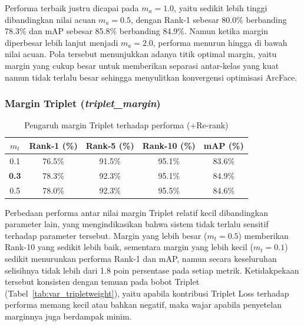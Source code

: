 Performa terbaik justru dicapai pada $m_a=1{.}0$, yaitu sedikit lebih tinggi dibandingkan nilai acuan $m_a=0{.}5$, dengan Rank-1 sebesar 80.0\% berbanding 78.3\% dan mAP sebesar 85.8\% berbanding 84.9\%. Namun ketika margin diperbesar lebih lanjut menjadi $m_a=2{.}0$, performa menurun hingga di bawah nilai acuan. Pola tersebut menunjukkan adanya titik optimal margin, yaitu margin yang cukup besar untuk memberikan separasi antar-kelas yang kuat namun tidak terlalu besar sehingga menyulitkan konvergensi optimisasi ArcFace.

\subsubsection{Margin Triplet (\textit{triplet\_margin})}

\begin{table}[H]
    \centering
    \caption{Pengaruh margin Triplet terhadap performa (+Re-rank)}
    \label{tab:var_tripletmargin}
    \renewcommand{\arraystretch}{1.25}
    \begin{tabular}{ccccc}
        \hline
        $m_t$          & \textbf{Rank-1 (\%)} & \textbf{Rank-5 (\%)} & \textbf{Rank-10 (\%)} & \textbf{mAP (\%)} \\
        \hline
        0{.}1         & 76.5\%               & 91.5\%               & 95.1\%                & 83.6\%             \\
        \textbf{0{.}3} & 78.3\%               & 92.3\%               & 95.1\%                & 84.9\%            \\
        0{.}5          & 78.0\%               & 92.3\%               & 95.5\%                & 84.6\%            \\
        \hline
    \end{tabular}
\end{table}

Perbedaan performa antar nilai margin Triplet relatif kecil dibandingkan parameter lain, yang mengindikasikan bahwa sistem tidak terlalu sensitif terhadap parameter tersebut. Margin yang lebih besar ($m_t=0{.}5$) memberikan Rank-10 yang sedikit lebih baik, sementara margin yang lebih kecil ($m_t=0{.}1$) sedikit menurunkan performa Rank-1 dan mAP, namun secara keseluruhan selisihnya tidak lebih dari 1.8 poin persentase pada setiap metrik. Ketidakpekaan tersebut konsisten dengan temuan pada bobot Triplet (Tabel~\ref{tab:var_tripletweight}), yaitu apabila kontribusi Triplet Loss terhadap performa memang kecil atau bahkan negatif, maka wajar apabila penyetelan marginnya juga berdampak minim.

